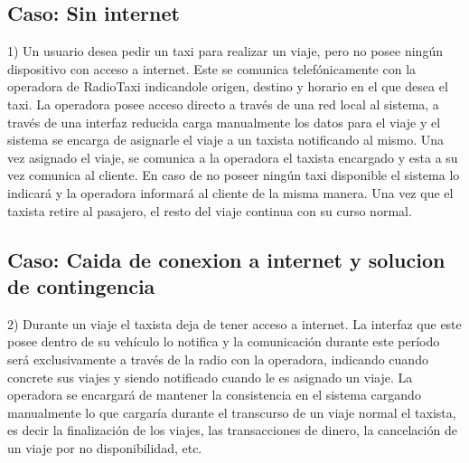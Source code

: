 \subsection{Caso: Sin internet}
1) Un usuario desea pedir un taxi para realizar un viaje, pero no posee ningún dispositivo con acceso a internet. Este se comunica telefónicamente con la operadora de RadioTaxi indicandole origen, destino y horario en el que desea el taxi. La operadora posee acceso directo a través de una red local al sistema, a través de una interfaz reducida carga manualmente los datos para el viaje y el sistema se encarga de asignarle el viaje a un taxista notificando al mismo. Una vez asignado el viaje, se comunica a la operadora el taxista encargado y esta a su vez comunica al cliente. En caso de no poseer ningún taxi disponible el sistema lo indicará y la operadora informará al cliente de la misma manera. Una vez que el taxista retire al pasajero, el resto del viaje continua con su curso normal.

\subsection{Caso: Caida de conexion a internet y solucion de contingencia}
2) Durante un viaje el taxista deja de tener acceso a internet. La interfaz que este posee dentro de su veh\'iculo lo notifica y la comunicación durante este per\'iodo será exclusivamente a través de la radio con la operadora, indicando cuando concrete sus viajes y siendo notificado cuando le es asignado un viaje. La operadora se encargará de mantener la consistencia en el sistema cargando manualmente lo que cargar\'ia durante el transcurso de un viaje normal el taxista, es decir la finalización de los viajes, las transacciones de dinero, la cancelación de un viaje por no disponibilidad, etc.



